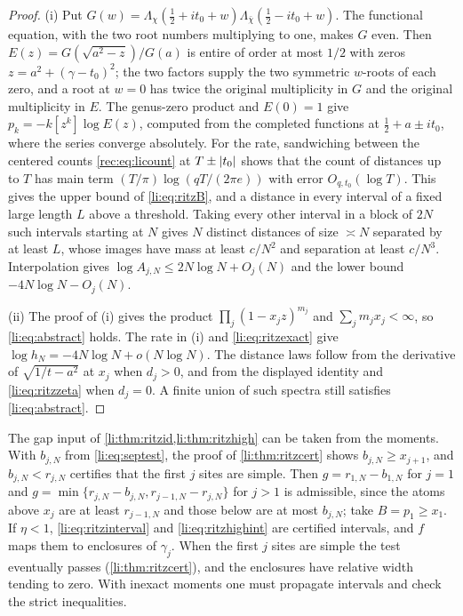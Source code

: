\begin{proof}
(i) Put $G(w)=\Lambda_\chi(\frac12+it_0+w)\Lambda_{\bar\chi}(\frac12-it_0+w)$. The functional equation,
with the two root numbers multiplying to one, makes $G$ even. Then $E(z)=G(\sqrt{a^2-z})/G(a)$ is
entire of order at most $1/2$ with zeros $z=a^2+(\gamma-t_0)^2$; the two factors supply the two
symmetric $w$-roots of each zero, and a root at $w=0$ has twice the original multiplicity in $G$
and the original multiplicity in $E$. The genus-zero product and $E(0)=1$ give
$p_k=-k[z^k]\log E(z)$, computed from the completed functions at $\frac12+a\pm it_0$, where the
series converge absolutely. For the rate, sandwiching between the centered counts
\eqref{rec:eq:licount} at $T\pm\lvert t_0\rvert$ shows that the count of distances up to $T$ has main
term $(T/\pi)\log(qT/(2\pi e))$ with error $O_{q,t_0}(\log T)$. This gives the upper bound
of \eqref{li:eq:ritzB}, and a distance in every interval of a fixed large length $L$ above a
threshold. Taking every other interval in a block of $2N$ such intervals starting at $N$ gives $N$
distinct distances of size $\asymp N$ separated by at least $L$, whose images have mass at least
$c/N^2$ and separation at least $c/N^3$. Interpolation gives $\log A_{j,N}\le2N\log N+O_j(N)$ and
the lower bound $-4N\log N-O_j(N)$.

(ii) The proof of (i) gives the product $\prod_j(1-x_jz)^{m_j}$ and $\sum_jm_jx_j<\infty$, so
\eqref{li:eq:abstract} holds. The rate in (i) and
\eqref{li:eq:ritzexact} give $\log h_N=-4N\log N+o(N\log N)$. The distance laws follow from the
derivative of $\sqrt{1/t-a^2}$ at $x_j$ when $d_j>0$, and from the displayed identity and
\eqref{li:eq:ritzzeta} when $d_j=0$. A finite union of such spectra still satisfies
\eqref{li:eq:abstract}.
\end{proof}

\begin{remark}\label{li:rem:ritzgap}
The gap input of \cref{li:thm:ritzid,li:thm:ritzhigh} can be taken from the moments. With
$b_{j,N}$ from \eqref{li:eq:septest}, the proof of \cref{li:thm:ritzcert} shows $b_{j,N}\ge x_{j+1}$,
and $b_{j,N}<r_{j,N}$ certifies that the first $j$ sites are simple. Then
$g=r_{1,N}-b_{1,N}$ for $j=1$ and $g=\min\{r_{j,N}-b_{j,N},r_{j-1,N}-r_{j,N}\}$ for $j>1$ is admissible,
since the atoms above $x_j$ are at least $r_{j-1,N}$ and those below are at most $b_{j,N}$; take
$B=p_1\ge x_1$. If $\eta<1$, \eqref{li:eq:ritzinterval} and \eqref{li:eq:ritzhighint} are certified
intervals, and $f$ maps them to enclosures of $\gamma_j$. When the first $j$ sites are simple the test
eventually passes (\cref{li:thm:ritzcert}), and the enclosures have relative width tending to zero.
With inexact moments one must propagate intervals and check the strict inequalities.
\end{remark}

